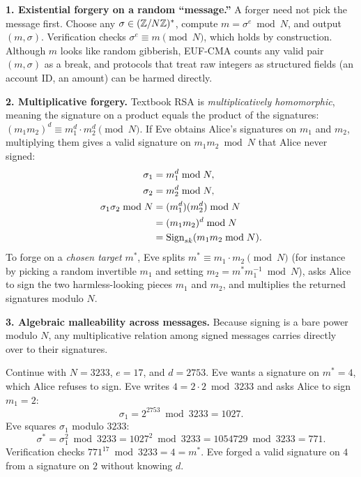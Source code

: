 \begin{attackbox}
\textbf{1. Existential forgery on a random ``message.''} A forger need not pick the message first. Choose any $\sigma \in (\mathbb{Z}/N\mathbb{Z})^{*}$, compute $m = \sigma^{e} \bmod N$, and output $(m, \sigma)$. Verification checks $\sigma^e \equiv m \pmod N$, which holds by construction. Although $m$ looks like random gibberish, EUF-CMA counts any valid pair $(m, \sigma)$ as a break, and protocols that treat raw integers as structured fields (an account ID, an amount) can be harmed directly.

\textbf{2. Multiplicative forgery.} Textbook RSA is \emph{multiplicatively homomorphic}, meaning the signature on a product equals the product of the signatures: $(m_1 m_2)^d \equiv m_1^d \cdot m_2^d \pmod N$. If Eve obtains Alice's signatures on $m_1$ and $m_2$, multiplying them gives a valid signature on $m_1 m_2 \bmod N$ that Alice never signed:
\begin{align*}
  \sigma_1 &= m_1^d \bmod N, \\
  \sigma_2 &= m_2^d \bmod N, \\
  \sigma_1\sigma_2 \bmod N &= (m_1^d)(m_2^d) \bmod N \\
  &= (m_1 m_2)^d \bmod N \\
  &= \operatorname{Sign}_{sk}(m_1 m_2 \bmod N).
\end{align*}
To forge on a \emph{chosen target} $m^*$, Eve splits $m^* \equiv m_1 \cdot m_2 \pmod N$ (for instance by picking a random invertible $m_1$ and setting $m_2 = m^* m_1^{-1} \bmod N$), asks Alice to sign the two harmless-looking pieces $m_1$ and $m_2$, and multiplies the returned signatures modulo $N$.

\textbf{3. Algebraic malleability across messages.} Because signing is a bare power modulo $N$, any multiplicative relation among signed messages carries directly over to their signatures.
\end{attackbox}

\begin{example}
\label{ch22:ex-mult-forge}
Continue with $N = 3233$, $e = 17$, and $d = 2753$. Eve wants a signature on $m^* = 4$, which Alice refuses to sign. Eve writes $4 = 2 \cdot 2 \bmod 3233$ and asks Alice to sign $m_1 = 2$:
\[
  \sigma_1 = 2^{2753} \bmod 3233 = 1027.
\]
Eve squares $\sigma_1$ modulo $3233$:
\[
  \sigma^* = \sigma_1^2 \bmod 3233 = 1027^2 \bmod 3233 = 1054729 \bmod 3233 = 771.
\]
Verification checks $771^{17} \bmod 3233 = 4 = m^*$. Eve forged a valid signature on $4$ from a signature on $2$ without knowing $d$.
\end{example}

